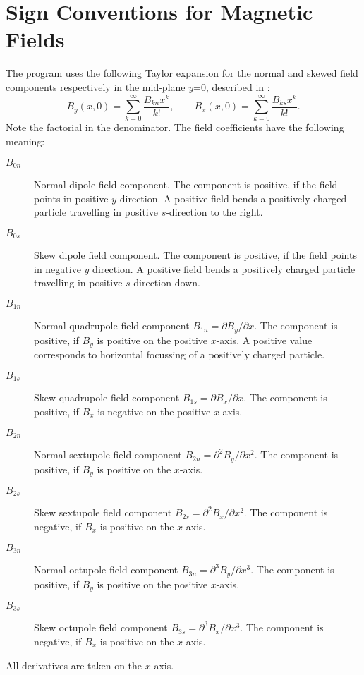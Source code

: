 \section{Sign Conventions for Magnetic Fields}
\label{sec:sign}
The \opalmap program uses the following Taylor expansion for the normal and
skewed field components respectively in the mid-plane $y$=0, 
described in :
\[
B_y(x,0)=\sum_{k=0}^{\infty}\frac{B_{kn}x^k}{k!}, \qquad
B_x(x,0)=\sum_{k=0}^{\infty}\frac{B_{ks}x^k}{k!}.
\]
Note the factorial in the denominator.
The field coefficients have the following meaning:
\begin{description}
\item[$B_{0n}$] Normal dipole field component.
  The component is positive, if the field points in positive $y$
  direction. 
  A positive field bends a positively charged particle travelling in
  positive $s$-direction to the right.
\item[$B_{0s}$] Skew dipole field component.
  The component is positive, if the field points in negative $y$
  direction. 
  A positive field bends a positively charged particle travelling in
  positive $s$-direction down.
\item[$B_{1n}$] Normal quadrupole field component
  $B_{1n}=\partial B_y/\partial x$.
  The component is positive, if $B_y$ is positive on the positive $x$-axis.
  A positive value corresponds to horizontal focussing of a positively
  charged particle.
\item[$B_{1s}$] Skew quadrupole field component
  $B_{1s}=\partial B_x/\partial x$.
  The component is positive, if $B_x$ is negative on the positive $x$-axis.
\item[$B_{2n}$] Normal sextupole field component
  $B_{2n}=\partial^2 B_y/\partial x^2$.
  The component is positive, if $B_y$ is positive on the $x$-axis.
\item[$B_{2s}$] Skew sextupole field component
  $B_{2s}=\partial^2 B_x/\partial x^2$.
  The component is negative, if $B_x$ is positive on the $x$-axis.
\item[$B_{3n}$] Normal octupole field component
  $B_{3n}=\partial^3 B_y/\partial x^3$.
  The component is positive, if $B_y$ is positive on the positive $x$-axis.
\item[$B_{3s}$] Skew octupole field component
  $B_{3s}=\partial^3 B_x/\partial x^3$.
  The component is negative, if $B_x$ is positive on the $x$-axis.
\end{description}
All derivatives are taken on the $x$-axis.
